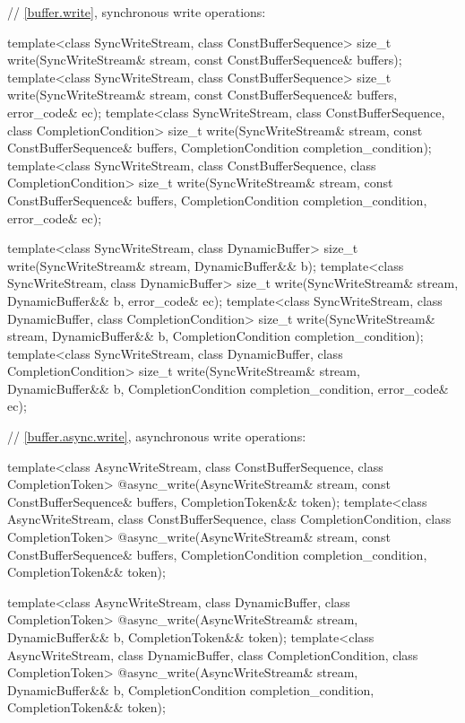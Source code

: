 \begin{codeblock}
{{{{  // \ref{buffer.write}, synchronous write operations:

  template<class SyncWriteStream, class ConstBufferSequence>
    size_t write(SyncWriteStream& stream,
                 const ConstBufferSequence& buffers);
  template<class SyncWriteStream, class ConstBufferSequence>
    size_t write(SyncWriteStream& stream,
                 const ConstBufferSequence& buffers, error_code& ec);
  template<class SyncWriteStream, class ConstBufferSequence,
    class CompletionCondition>
      size_t write(SyncWriteStream& stream,
                   const ConstBufferSequence& buffers,
                   CompletionCondition completion_condition);
  template<class SyncWriteStream, class ConstBufferSequence,
    class CompletionCondition>
      size_t write(SyncWriteStream& stream,
                   const ConstBufferSequence& buffers,
                   CompletionCondition completion_condition,
                   error_code& ec);

  template<class SyncWriteStream, class DynamicBuffer>
    size_t write(SyncWriteStream& stream, DynamicBuffer&& b);
  template<class SyncWriteStream, class DynamicBuffer>
    size_t write(SyncWriteStream& stream, DynamicBuffer&& b, error_code& ec);
  template<class SyncWriteStream, class DynamicBuffer, class CompletionCondition>
    size_t write(SyncWriteStream& stream, DynamicBuffer&& b,
                 CompletionCondition completion_condition);
  template<class SyncWriteStream, class DynamicBuffer, class CompletionCondition>
    size_t write(SyncWriteStream& stream, DynamicBuffer&& b,
                 CompletionCondition completion_condition, error_code& ec);

  // \ref{buffer.async.write}, asynchronous write operations:

  template<class AsyncWriteStream, class ConstBufferSequence,
    class CompletionToken>
      @\DEDUCED@ async_write(AsyncWriteStream& stream,
                          const ConstBufferSequence& buffers,
                          CompletionToken&& token);
  template<class AsyncWriteStream, class ConstBufferSequence,
    class CompletionCondition, class CompletionToken>
      @\DEDUCED@ async_write(AsyncWriteStream& stream,
                          const ConstBufferSequence& buffers,
                          CompletionCondition completion_condition,
                          CompletionToken&& token);

  template<class AsyncWriteStream, class DynamicBuffer, class CompletionToken>
    @\DEDUCED@ async_write(AsyncWriteStream& stream,
                     DynamicBuffer&& b, CompletionToken&& token);
  template<class AsyncWriteStream, class DynamicBuffer,
    class CompletionCondition, class CompletionToken>
      @\DEDUCED@ async_write(AsyncWriteStream& stream,
                          DynamicBuffer&& b,
                          CompletionCondition completion_condition,
                          CompletionToken&& token);

}}}}
\end{codeblock}
